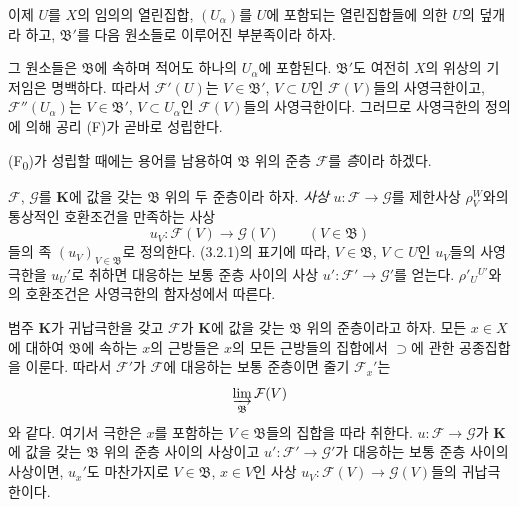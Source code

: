 \begin{env}[3.2.2]
이제 $U$를 $X$의 임의의 열린집합, $(U_\alpha)$를 $U$에 포함되는 열린집합들에 의한 $U$의 덮개라 하고, $\mathfrak B'$를 다음 원소들로 이루어진 부분족이라 하자.


그 원소들은 $\mathfrak B$에 속하며 적어도 하나의 $U_\alpha$에 포함된다. $\mathfrak B'$도 여전히 $X$의 위상의 기저임은 명백하다. 따라서 $\mathcal F'(U)$는 $V\in\mathfrak B'$, $V\subset U$인 $\mathcal F(V)$들의 사영극한이고, $\mathcal F''(U_\alpha)$는 $V\in\mathfrak B'$, $V\subset U_\alpha$인 $\mathcal F(V)$들의 사영극한이다. 그러므로 사영극한의 정의에 의해 공리 (F)가 곧바로 성립한다.

(F\textsubscript{0})가 성립할 때에는 용어를 남용하여 $\mathfrak B$ 위의 준층 $\mathcal F$를 \emph{층}이라 하겠다.
\end{env}

\begin{env}[3.2.3]
\label{0.3.2.3-ko}
$\mathcal F$, $\mathcal G$를 $\mathbf K$에 값을 갖는 $\mathfrak B$ 위의 두 준층이라 하자. \emph{사상} $u:\mathcal F\to\mathcal G$를 제한사상 $\rho_V^W$와의 통상적인 호환조건을 만족하는 사상
\[
  u_V:\mathcal F(V)\longrightarrow\mathcal G(V)
  \qquad(V\in\mathfrak B)
\]
들의 족 $(u_V)_{V\in\mathfrak B}$로 정의한다. (3.2.1)의 표기에 따라, $V\in\mathfrak B$, $V\subset U$인 $u_V$들의 사영극한을 $u_U'$로 취하면 대응하는 보통 준층 사이의 사상 $u':\mathcal F'\to\mathcal G'$를 얻는다. $\rho'_U{}^{U'}$와의 호환조건은 사영극한의 함자성에서 따른다.
\end{env}

\begin{env}[3.2.4]
\label{0.3.2.4-ko}
범주 $\mathbf K$가 귀납극한을 갖고 $\mathcal F$가 $\mathbf K$에 값을 갖는 $\mathfrak B$ 위의 준층이라고 하자. 모든 $x\in X$에 대하여 $\mathfrak B$에 속하는 $x$의 근방들은 $x$의 모든 근방들의 집합에서 $\supset$에 관한 공종집합을 이룬다. 따라서 $\mathcal F'$가 $\mathcal F$에 대응하는 보통 준층이면 줄기 $\mathcal F_x'$는
\[
  \varinjlim_{\mathfrak B}\mathcal F(V)
\]
와 같다. 여기서 극한은 $x$를 포함하는 $V\in\mathfrak B$들의 집합을 따라 취한다. $u:\mathcal F\to\mathcal G$가 $\mathbf K$에 값을 갖는 $\mathfrak B$ 위의 준층 사이의 사상이고 $u':\mathcal F'\to\mathcal G'$가 대응하는 보통 준층 사이의 사상이면, $u_x'$도 마찬가지로 $V\in\mathfrak B$, $x\in V$인 사상 $u_V:\mathcal F(V)\to\mathcal G(V)$들의 귀납극한이다.
\end{env}

